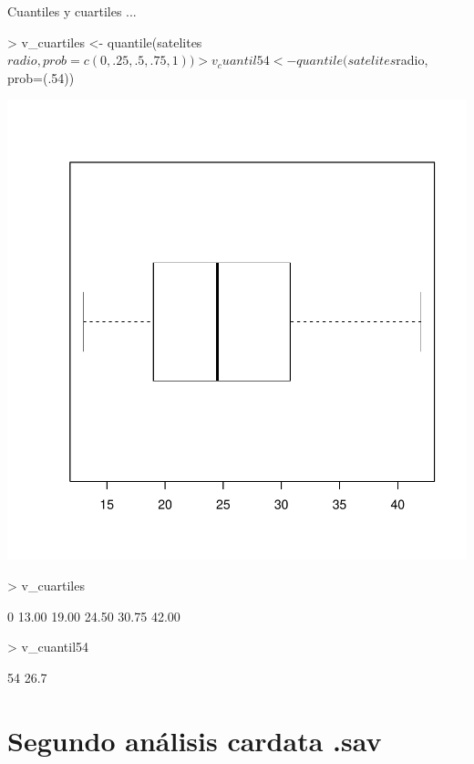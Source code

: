 \documentclass [a4paper] {article}
\begin{document}
Cuantiles y cuartiles ...
\begin{Schunk}
\begin{Sinput}
> v_cuartiles <- quantile(satelites$radio, prob=c(0, .25, .5, .75, 1))
> v_cuantil54 <- quantile(satelites$radio, prob=(.54))
\end{Sinput}
\end{Schunk}
\includegraphics{entrega-cuartiles_satelites_plot}
\begin{Schunk}
\begin{Sinput}
> v_cuartiles
\end{Sinput}
\begin{Soutput}
   0%
13.00 19.00 24.50 30.75 42.00 
\end{Soutput}
\begin{Sinput}
> v_cuantil54
\end{Sinput}
\begin{Soutput}
 54%
26.7 
\end{Soutput}
\end{Schunk}

\section{Segundo análisis cardata .sav}
\end{document}
